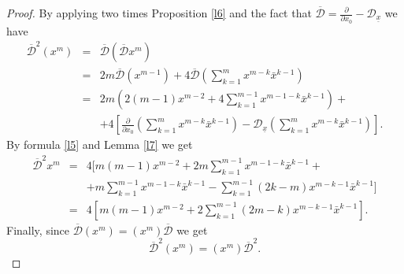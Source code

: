 \documentclass[reqno,11pt]{amsart}
\numberwithin{equation}{section}
\theoremstyle{definition}
\begin{document}
\begin{proof}
By applying two times Proposition \ref{l6} and the fact that $ \mathcal{\overline{D}}=\frac{\partial}{\partial x_0}- \mathcal{D}_{\underline{x}}$ we have
\begin{eqnarray*}
\mathcal{\overline{D}}^2 (x^m)&=& \mathcal{\overline{D}}(\mathcal{\overline{D}} x^m)\\
&=& 2m \mathcal{\overline{D}}(x^{m-1})+4\mathcal{\overline{D}} \left( \sum_{k=1}^m x^{m-k} \bar{x}^{k-1} \right) \\
&=& 2m \left( 2(m-1) x^{m-2} +4 \sum_{k=1}^{m-1} x^{m-1-k} \bar{x}^{k-1}\right)+\\
&& +4 \left[ \frac{\partial}{\partial x_0}\left( \sum_{k=1}^m x^{m-k} \bar{x}^{k-1} \right) - \mathcal{D}_{\underline{x}}\left( \sum_{k=1}^m x^{m-k} \bar{x}^{k-1} \right) \right].
\end{eqnarray*}
By formula \eqref{l5} and Lemma \ref{l7} we get
\begin{eqnarray*}
\mathcal{\overline{D}}^2 x^m&=&4 \biggl[m(m-1) x^{m-2}+2m \sum_{k=1}^{m-1} x^{m-1-k} \bar{x}^{k-1}+\\
&& +m \sum_{k=1}^{m-1} x^{m-1-k} \bar{x}^{k-1}- \sum_{k=1}^{m-1}(2k-m) x^{m-k-1} \bar{x}^{k-1} \biggl]\\
&=& 4 \left[m(m-1) x^{m-2}+2 \sum_{k=1}^{m-1} (2m-k)x^{m-k-1} \bar{x}^{k-1}\right].
\end{eqnarray*}
Finally, since $ \mathcal{\overline{D}} (x^m)= (x^m)\mathcal{\overline{D}}$ we get
$$ \mathcal{\overline{D}}^2 (x^m)= (x^m)\mathcal{\overline{D}}^2.$$
\end{proof}
\end{document}
